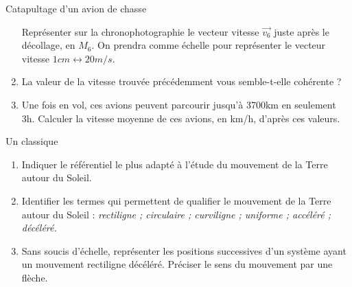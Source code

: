 \documentclass[12pt,a4paper]{article}
\begin{document}
\begin{exo}{Catapultage d'un avion de chasse}
\begin{enumerate}[resume]
Représenter sur la chronophotographie le vecteur vitesse $\vec{v_6}$ juste après le décollage, en $M_6$.
On prendra comme échelle pour représenter le vecteur vitesse $\unit{1}{cm} \leftrightarrow \unit{20}{m/s}$.

\item \rea{}  \val{} 

La valeur de la vitesse trouvée précédemment vous semble-t-elle cohérente ?

\item \rea{} 

Une fois en vol, ces avions peuvent parcourir jusqu'à \unit{3700}{km} en seulement \unit{3}{h}.
Calculer la vitesse moyenne de ces avions, en km/h, d'après ces valeurs.
\end{enumerate}

\end{exo}

\begin{exo}{Un classique}

\begin{multicols}{2}
\begin{enumerate}
\item \anarai{} 

Indiquer le référentiel le plus adapté à l'étude du mouvement de la Terre autour du Soleil.

\item \rco{} 

Identifier les termes qui permettent de qualifier le mouvement de la Terre autour du Soleil :
\emph{rectiligne ; circulaire ; curviligne ; uniforme ; accéléré ; décéléré.}
\end{enumerate}

\begin{center}
\end{center}
\end{multicols}

\begin{enumerate}
\setcounter{enumi}{2}
\item \rco{} 

Sans soucis d'échelle, représenter les positions successives d'un système ayant un mouvement rectiligne décéléré.
Préciser le sens du mouvement par une flèche.
\end{enumerate}

\end{exo}
\end{document}
